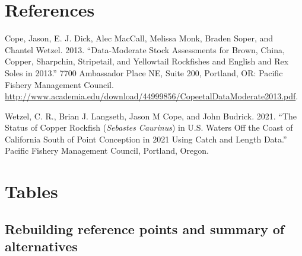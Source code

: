 \documentclass[11pt,
  english,
  a4paper,
]{article}
\newlength{\cslhangindent}
\newenvironment{CSLReferences}[2] %
 {%
  \setlength{\parindent}{0pt}
  \ifodd #1 \everypar{\setlength{\hangindent}{\cslhangindent}}\ignorespaces\fi
  \ifnum #2 > 0
  \setlength{\parskip}{#2\baselineskip}
  \fi
 }%
 {}
\begin{document}
\leavevmode\tagmcend\tagstructend\par

\clearpage


\hypertarget{references}{%
\section{References}\label{references}}

\leavevmode\tagmcend\tagstructend


\hypertarget{refs}{}
\begin{CSLReferences}{1}{0}
\leavevmode{}%
Cope, Jason, E. J. Dick, Alec MacCall, Melissa Monk, Braden Soper, and Chantel Wetzel. 2013. {``Data-Moderate Stock Assessments for Brown, {China}, Copper, Sharpchin, Stripetail, and Yellowtail Rockfishes and {English} and Rex Soles in 2013.''} 7700 Ambassador Place NE, Suite 200, Portland, OR: Pacific Fishery Management Council. \url{http://www.academia.edu/download/44999856/CopeetalDataModerate2013.pdf}.

\leavevmode{}%
Wetzel, C. R., Brian J. Langseth, Jason M Cope, and John Budrick. 2021. {``The Status of Copper Rockfish (\emph{{Sebastes} Caurinus}) in {U}.{S}. Waters Off the Coast of {California} South of {Point} {Conception} in 2021 Using Catch and Length Data.''} Pacific Fishery Management Council, Portland, Oregon.

\end{CSLReferences}

\leavevmode\tagmcend\tagstructend

\clearpage


\hypertarget{tables}{%
\section{Tables}\label{tables}}

\leavevmode\tagmcend\tagstructend


\hypertarget{rebuilding-reference-points-and-summary-of-alternatives}{%
\subsection{Rebuilding reference points and summary of alternatives}\label{rebuilding-reference-points-and-summary-of-alternatives}}
\end{document}
